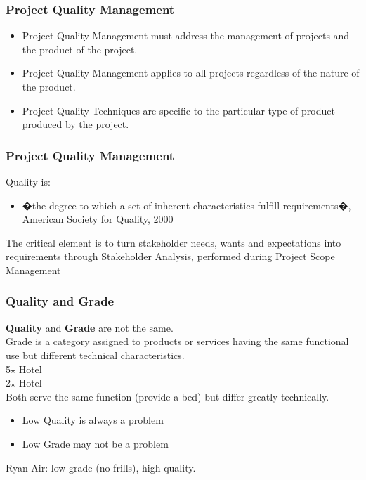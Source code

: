 \begin{frame}
\frametitle{Project Quality Management}
\begin{itemize}
	\item Project Quality Management must address the management of projects and the product of the project.
	\item Project Quality Management applies to all projects regardless of the nature of the product.
	\item Project Quality Techniques are specific to the particular type of product produced by the project.
\end{itemize}
\end{frame}




\begin{frame}
\frametitle{Project Quality Management}

Quality is:
\begin{itemize}
\item �the degree to which a set of inherent characteristics fulfill requirements�, American Society for Quality, 2000
\end{itemize}
The critical element is to turn stakeholder needs, wants and expectations into requirements through Stakeholder Analysis, performed during Project Scope Management
\end{frame}




\begin{frame}
\frametitle{Quality and Grade}
\textbf{Quality} and \textbf{Grade} are not the same.  \\
Grade is a category assigned to products or services having the same functional use but different technical characteristics. \\
\hspace{1cm} 5$\star$ Hotel\\
\hspace{1cm} 2$\star$ Hotel\\
Both serve the same function (provide a bed) but differ greatly technically.
\begin{itemize}
	\item Low Quality is always a problem
	\item Low Grade may not be a problem
\end{itemize}
Ryan Air: low grade (no frills), high quality.
\end{frame}




